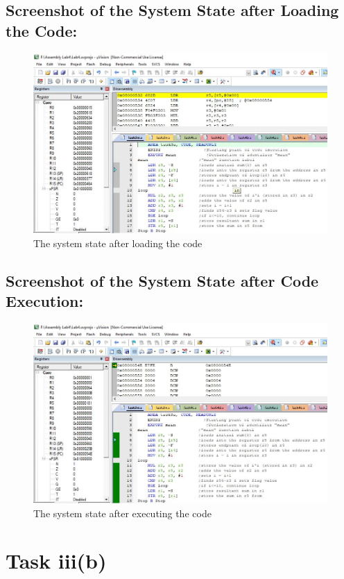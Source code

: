 \documentclass[12pt]{article}
\begin{document}
\subsection{Screenshot of the System State after Loading the Code:}
\begin{figure}[ht]
     \centering
     \includegraphics[scale=.7]{images/beforetask3a.JPG}
     \caption{The system state after loading the code}
     \label{fig:before_task_three_a}
 \end{figure}
 \pagebreak
 \subsection{Screenshot of the System State after Code Execution:}
 \begin{figure}[ht]
     \centering
     \includegraphics[scale=.7]{images/aftertask3a.JPG}
     \caption{The system state after executing the code}
     \label{fig:after_task_three_a}
 \end{figure}
 \pagebreak
\section{Task iii(b)}
\end{document}
